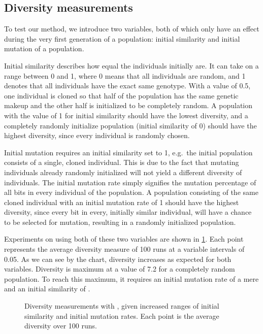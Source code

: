 \subsection{Diversity measurements}
To test our \dia{} method, we introduce two variables, both of which only have an effect during the very first generation of a population: initial similarity and initial mutation of a population. 

Initial similarity describes how equal the individuals initially are. It can take on a range between \num{0} and \num{1}, where \num{0} means that all individuals are random, and \num{1} denotes that  all individuals have the exact same genotype. With a value of \num{0.5}, one individual is cloned so that half of the population has the same genetic makeup and the other half is initialized to be completely random. A population with the value of \num{1} for initial similarity should have the lowest diversity, and a completely randomly initialize population (initial similarity of \num{0}) should have the highest diversity, since every individual is randomly chosen.

Initial mutation requires an initial similarity set to \num{1}, e.g.\ the initial population consists of a single, cloned individual. This is due to the fact that mutating individuals already randomly initialized will not yield a different diversity of individuals. The initial mutation rate simply signifies the mutation percentage of all bits in every individual of the population. A population consisting of the same cloned individual with an initial mutation rate of \num{1} should have the highest diversity, since every bit in every, initially similar individual, will have a  chance to be selected for mutation, resulting in a randomly initialized population.

Experiments on \dia{} using both of these two variables are shown in \cref{fig:initial-mutation-similarity}. Each point represents the average diversity measure of \num{100} runs at a variable intervals of \num{0.05}. As we can see by the chart, diversity increases as expected for both variables. Diversity is maximum at a value of \num{7.2} for a completely random population. To reach this maximum, it requires an initial mutation rate of a mere  and an initial similarity of .

\begin{figure}[htpb]
  \centering
  \caption{Diversity measurements with \dia{}, given increased ranges of initial similarity and initial mutation rates. Each point is the average diversity over \num{100} runs.}\label{fig:initial-mutation-similarity}
\end{figure}
